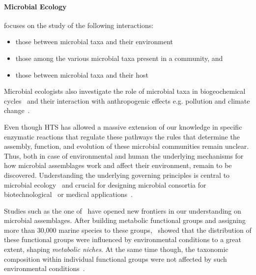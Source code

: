       \paragraph{Microbial Ecology} focuses on the study of the following interactions: 
      \begin{itemize}
         \setlength\itemsep{0.05em}
         \item those between microbial taxa and their environment
         \item those among the various microbial taxa present in a community, and
         \item those between microbial taxa and their host~\cite{isme}
      \end{itemize}

      Microbial ecologists also investigate the role of microbial taxa in 
      biogeochemical cycles~\cite{falkowski2008microbial} and their interaction 
      with anthropogenic effects e.g. pollution and climate change~\cite{cavicchioli2019scientists}.

      Even though HTS has allowed a massive extension of our knowledge in  
      specific enzymatic reactions that regulate these pathways the rules that determine 
      the assembly, function, and evolution of these microbial communities remain unclear. 
      Thus, both in case of environmental and human
      the underlying mechanisms for how microbial assemblages work and affect their environment, remain to be discovered.
      Understanding the underlying governing principles is central to microbial ecology~\cite{giri2021metabolic} and crucial for designing microbial consortia for biotechnological~\cite{giri2020harnessing} or medical applications~\cite{kong2018designing}.

      Studies such as the one of~\citeauthor{louca2016decoupling}
      have opened new frontiers in our understanding on microbial assemblages. 
      After building metabolic functional groups and assigning more than 30,000 marine 
      species to these groups,~\citeauthor{louca2016decoupling} showed 
      that the distribution of these functional groups were influenced by environmental 
      conditions to a great extent, shaping \textit{metabolic niches}.
      At the same time though, the taxonomic composition within individual functional groups
      were not affected by such environmental conditions~\cite{louca2016decoupling}.

